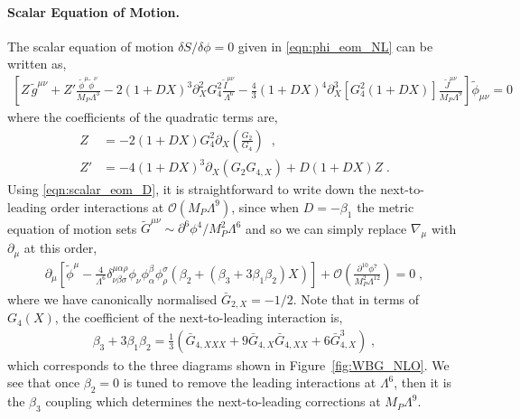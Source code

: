\documentclass[11pt]{article}
\newcommand{\G}{  \bar{G} }
\begin{document}
\paragraph{Scalar Equation of Motion.}
The scalar equation of motion $\delta S / \delta \phi = 0$ given in \eqref{eqn:phi_eom_NL} can be written as,
\begin{align}
\left[ Z \,  \tilde{g}^{\mu\nu} 
+  Z' \frac{ \tilde{\phi}^\mu \tilde{\phi}^\nu}{ M_P \Lambda^3}
 -   2  (1 + D X )^3 \partial_X^2 G_{4}^2  \frac{ \tilde{I}^{\mu\nu} }{\Lambda^6} 
 - \frac{4}{3}  (1 + D X)^4 \partial_X^3 \left[  G_4^2    (1 + D X ) \right]  \frac{ \tilde{J}^{\mu\nu}}{M_P \Lambda^{9}}   \right] \tilde{\phi}_{\mu\nu}  = 0 
 \label{eqn:scalar_eom_D}
\end{align}
where the coefficients of the quadratic terms are,
\begin{align}
Z &=  - 2  (1 + D X) G_4^2 \partial_X \left( \frac{G_2}{G_{4}}  \right)  \;\; , \\
Z' &=  - 4 (1 + D X)^3 \partial_X \left( G_2 G_{4,X} \right) + D (1 + D X ) Z  \; .
\end{align}
Using \eqref{eqn:scalar_eom_D}, it is straightforward to write down the next-to-leading order interactions at $\mathcal{O} \left( M_P \Lambda^9  \right)$, since when $D = -\beta_1$ the metric equation of motion sets $\tilde{G}^{\mu\nu} \sim \partial^6 \phi^4/ M_P^2 \Lambda^6$ and so we can simply replace $\nabla_\mu$ with $\partial_\mu$ at this order,
\begin{align}
\partial_\mu \left[ 
 \tilde{\phi}^\mu 
 - \frac{4}{\Lambda^6} \delta^{\mu \alpha  \rho}_{\nu \beta \sigma} \phi_\nu \phi_\alpha^\beta \phi_\rho^\sigma \left( 
  \beta_2  +  \left(  \beta_3  + 3 \beta_1 \beta_2  \right)  X  
 \right)
  \right] + \mathcal{O} \left( \frac{ \partial^{10} \phi^7 }{ M_P^2 \Lambda^{12} }  \right)  = 0  \; ,
  \label{eqn:phi_eom_NLO}
\end{align}
where we have canonically normalised $\bar{G}_{2,X} = - 1/2$.
Note that in terms of $G_4 (X)$, the coefficient of the next-to-leading interaction is,
\begin{align}
 \beta_3 + 3 \beta_1 \beta_2 = \frac{1}{3} \left(  \G_{4,XXX} + 9 \G_{4,X} \G_{4,XX} + 6 \G_{4,X}^3   \right) \; ,
\end{align} 
which corresponds to the three diagrams shown in Figure~\ref{fig:WBG_NLO}. 
We see that once $\beta_2 = 0$ is tuned to remove the leading interactions at $\Lambda^6$, then it is the $\beta_3$ coupling which determines the next-to-leading corrections at $M_P \Lambda^9$.
\end{document}
